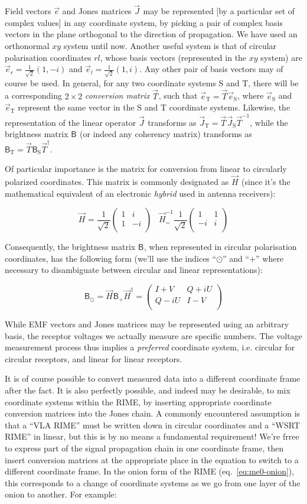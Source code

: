 \documentclass[]{aa}
\newcommand{\matrixtt}[4]{\left( \begin{array}{cc}#1&#2\\#3&#4\\\end{array} \right)}
\newcommand{\jones}[2]{\vec {#1}_{#2}}
\newcommand{\jonesinv}[2]{\vec {#1}^{-1}_{#2}}
\newcommand{\jonesT}[2]{\vec {#1}^\dagger_{#2}}
\newcommand{\coh}[2]{\mathsf{{#1}}_{{#2}}}
\begin{document}
Field vectors $\vec e$ and Jones matrices $\jones{J}{}$ may be represented [by a particular set of complex values] in any coordinate system, by picking a pair of complex basis vectors in the plane orthogonal to the direction of propagation. We have used an orthonormal $xy$ system until now. Another useful system is that of circular polarisation coordinates $rl$, whose basis vectors (represented in the $xy$ system) are $\vec e_r=\frac{1}{\sqrt{2}}(1,-i)$ and $\vec e_l=\frac{1}{\sqrt{2}}(1,i)$. Any other pair of basis vectors may of course be used. In general, for any two coordinate systems S and T, there will be a corresponding $2\times2$ {\em conversion matrix} $\jones{T}{}$, such that $\vec e_\mathrm{T}=\jones{T}{} \vec e_\mathrm{S}$, where $\vec e_\mathrm{S}$ and $\vec e_\mathrm{T}$ represent the same vector in the S and T coordinate systems. Likewise, the representation of the linear operator $\jones{J}{}$ transforms as $\jones{J}{\mathrm{T}}=\jones{T}{} \jones{J}{\mathrm{S}} \jonesinv{T}{}$, while the brightness matrix $\coh{B}{}$ (or indeed any coherency matrix) transforms as $\coh{B}{\mathrm{T}}=\jones{T}{} \coh{B}{\mathrm{S}} \jonesT{T}{}.$

Of particular importance is the matrix for conversion from linear to circularly polarized coordinates. This matrix is commonly designated as $\jones{H}{}$ (since it's the mathematical equivalent of an electronic {\em hybrid} used in antenna receivers):

\[
\jones{H}{} = \frac{1}{\sqrt{2}} \matrixtt{1}{i}{1}{-i} \;\;\; \jonesinv{H} = \frac{1}{\sqrt{2}} \matrixtt{1}{1}{-i}{i}
\]

Consequently, the brightness matrix $\coh{B}{}$, when represented in circular polarisation coordinates, has the following form (we'll use the indices ``$\odot$'' and ``$+$'' where necessary to disambiguate between circular and linear representations):

\[
\coh{B}{\odot} = \jones{H}{} \coh{B}{+} \jonesT{H}{} = \matrixtt{I+V}{Q+iU}{Q-iU}{I-V}
\]

While EMF vectors and Jones matrices may be represented using an arbitrary basis, the receptor voltages we actually measure are specific numbers. The voltage measurement process thus implies a {\em preferred} coordinate system, i.e. circular for circular receptors, and linear for linear receptors. 

It is of course possible to convert measured data into a different coordinate frame after the fact. It is also perfectly possible, and indeed may be desirable, to mix coordinate systems within the RIME, by inserting appropriate coordinate conversion matrices into the Jones chain. A commonly encountered assumption is that a ``VLA RIME'' must be written down in circular coordinates and a ``WSRT RIME'' in linear, but this is by no means a fundamental requirement! We're frree to express part of the signal propagation chain in one coordinate frame, then insert conversion matrices at the appropriate place in the equation to switch to a different coordinate frame. In the onion form of the RIME (eq.~\ref{eq:me0-onion}), this corresponds to a change of coordinate systems as we go from one layer of the onion to another. For example:
\end{document}
